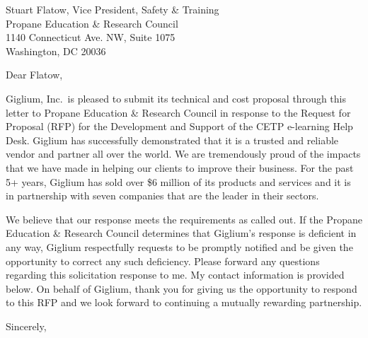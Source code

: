 \documentclass{letter}
\begin{document}
	
	\begin{letter}
		{
			Stuart Flatow, Vice President, Safety \& Training
			\\Propane Education \& Research Council
			\\1140 Connecticut Ave. NW, Suite 1075
			\\Washington, DC 20036
		}
		
		\opening{Dear Flatow,}
		
		Giglium, Inc.\ is pleased to submit its technical and cost proposal through this letter to
		Propane Education \& Research Council in response to the Request for Proposal (RFP)
		for the Development and Support of the CETP e-learning Help Desk. Giglium has successfully demonstrated that it is a trusted and reliable vendor and partner all over the world. We are tremendously proud of the impacts that we have made in helping our clients to improve their business. For the past 5+ years, Giglium has sold over \$6 million of its products and services and it is in partnership with seven companies that are the leader in their sectors.
		
		We believe that our response meets the requirements as called out. If the Propane Education \& Research Council
		determines that Giglium’s response is deficient in any way, Giglium respectfully requests to be promptly
		notified and be given the opportunity to correct any such deficiency. Please forward any questions
		regarding this solicitation response to me. My contact information is provided below.
		On behalf of Giglium, thank you for giving us the opportunity to respond to this RFP and we look forward to
		continuing a mutually rewarding partnership.
		
		\closing{Sincerely,}
		
	\end{letter}
\end{document}
